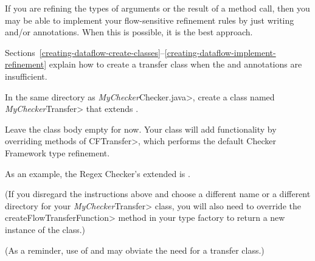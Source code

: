 If you are refining the types of arguments or the result of a method call,
then you may be able to implement your flow-sensitive refinement rules by
just writing  and/or
 annotations.
When this is possible, it is the best approach.

Sections~\ref{creating-dataflow-create-classes}--\ref{creating-dataflow-implement-refinement}
explain how to create a transfer class when the
 and
 annotations are insufficient.



In the same directory as \<\emph{MyChecker}Checker.java>, create a class
named \<\emph{MyChecker}Transfer> that extends
.

Leave the class body empty for now.  Your class will add functionality by
overriding methods of \<CFTransfer>, which performs the default Checker
Framework type refinement.

As an example, the Regex Checker's extended
 is
.

(If you disregard the instructions above and choose a different name or a
different directory for your \<\emph{MyChecker}Transfer> class, you will
also need to override the \<createFlowTransferFunction> method in your type
factory to return a new instance of the class.)

(As a reminder, use of  and
 may obviate the need for
a transfer class.)

%

